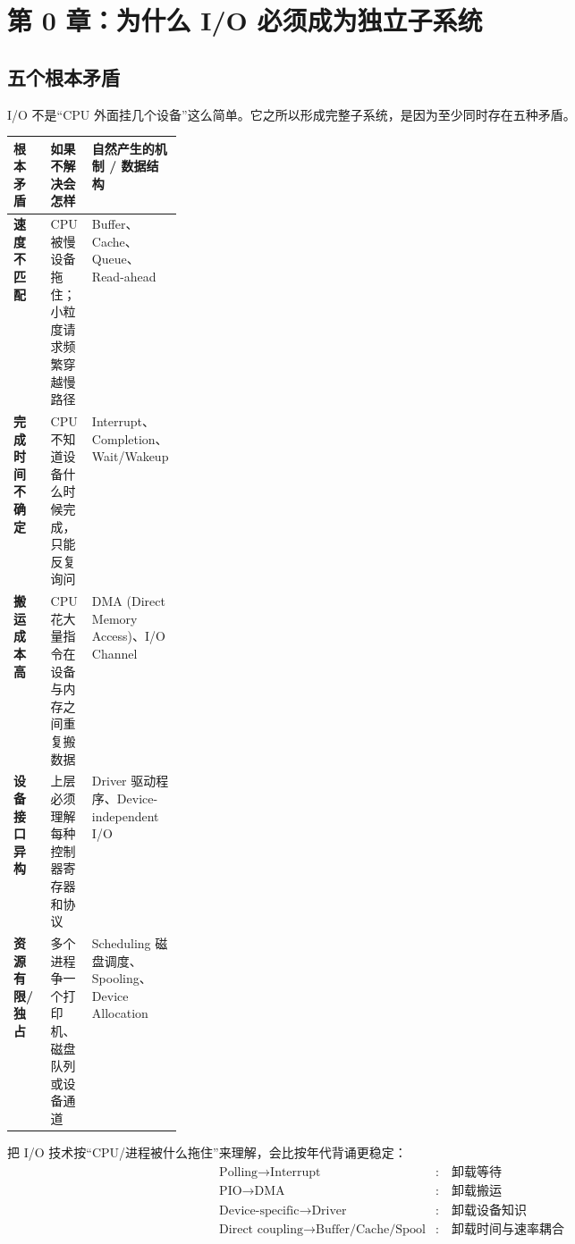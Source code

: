 \documentclass[UTF8,fontset=fandol,11pt,a4paper]{ctexart}
\begin{document}
\tableofcontents
\newpage

\section{第 0 章：为什么 I/O 必须成为独立子系统}

\subsection{五个根本矛盾}
I/O 不是“CPU 外面挂几个设备”这么简单。它之所以形成完整子系统，是因为至少同时存在五种矛盾。

\begin{center}

\begingroup
\small
\renewcommand{\arraystretch}{1.25}
\setlength{\tabcolsep}{6pt}
\begin{tabularx}{\linewidth}{>{\bfseries}p{0.22\linewidth} X X}
\toprule
根本矛盾 & 如果不解决会怎样 & 自然产生的机制 / 数据结构\\
\midrule
速度不匹配 & CPU 被慢设备拖住；小粒度请求频繁穿越慢路径 & Buffer、Cache、Queue、Read-ahead\\
完成时间不确定 & CPU 不知道设备什么时候完成，只能反复询问 & Interrupt、Completion、Wait/Wakeup\\
搬运成本高 & CPU 花大量指令在设备与内存之间重复搬数据 & DMA (Direct Memory Access)、I/O Channel\\
设备接口异构 & 上层必须理解每种控制器寄存器和协议 & Driver 驱动程序、Device-independent I/O\\
资源有限/独占 & 多个进程争一个打印机、磁盘队列或设备通道 & Scheduling 磁盘调度、Spooling、Device Allocation\\
\bottomrule
\end{tabularx}
\endgroup
\end{center}

\begin{bridge}[I/O 的四次“卸载”]
把 I/O 技术按“CPU/进程被什么拖住”来理解，会比按年代背诵更稳定：
\[
\boxed{
\begin{aligned}
\text{Polling}\to\text{Interrupt} &:\quad \text{卸载等待}\\
\text{PIO}\to\text{DMA} &:\quad \text{卸载搬运}\\
\text{Device-specific}\to\text{Driver} &:\quad \text{卸载设备知识}\\
\text{Direct coupling}\to\text{Buffer/Cache/Spool} &:\quad \text{卸载时间与速率耦合}
\end{aligned}}
\]
\end{bridge}
\end{document}
